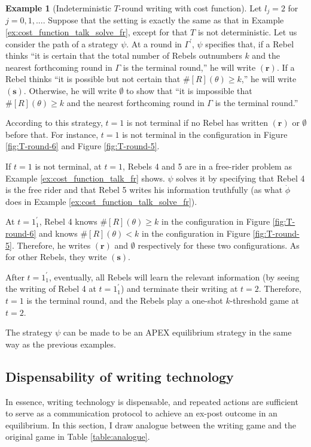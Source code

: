\documentclass[12pt,letter]{article}
\theoremstyle{definition}
\newtheorem{example}{Example}
\theoremstyle{remark}
\theoremstyle{claim}
\begin{document}
\begin{example}[Indeterministic $T$-round writing with cost function]
\label{ex:cost_function_talk_solve_fr_Indm}
Let $l_j=2$ for $j=0,1,...$. Suppose that the setting is exactly the same as that in Example \ref{ex:cost_function_talk_solve_fr}, except for that $T$ is not deterministic. Let us consider the path of a strategy $\psi$. At a round in $\Gamma^{'}$, $\psi$ specifies that, if a Rebel thinks ``it is certain that the total number of Rebels outnumbers $k$ and the nearest forthcoming round in $\Gamma$ is the terminal round,'' he will write $(\textbf{r})$. If a Rebel thinks ``it is possible but not certain that $\# [R](\theta)\geq k$,'' he will write $(\textbf{s})$. Otherwise, he will write $\emptyset$ to show that ``it is impossible that $\#[R](\theta)\geq k$ and the nearest forthcoming round in $\Gamma$ is the terminal round.'' 

According to this strategy, $t=1$ is not terminal if no Rebel has written $(\textbf{r})$ or $\emptyset$ before that. For instance, $t=1$ is not terminal in the configuration in Figure \ref{fig:T-round-6} and Figure \ref{fig:T-round-5}. 

If $t=1$ is not terminal, at $t=1$, Rebels 4 and 5 are in a free-rider problem as Example \ref{ex:cost_function_talk_fr} shows. $\psi$ solves it by specifying that Rebel 4 is the free rider and that Rebel 5 writes his information truthfully (as what $\dot{\phi}$ does in Example \ref{ex:cost_function_talk_solve_fr}). 

At $t=1^{'}_1$, Rebel 4 knows $\#[R](\theta)\geq k$ in the configuration in Figure \ref{fig:T-round-6} and knows $\#[R](\theta)< k$ in the configuration in Figure \ref{fig:T-round-5}. Therefore, he writes $(\textbf{r})$ and $\emptyset$ respectively for these two configurations. As for other Rebels, they write $(\textbf{s})$. 

After $t=1^{'}_1$, eventually, all Rebels will learn the relevant information (by seeing the writing of Rebel 4 at $t=1^{'}_1$) and terminate their writing at $t=2$. Therefore, $t=1$ is the terminal round, and the Rebels play a one-shot $k$-threshold game at $t=2$.

The strategy $\psi$ can be made to be an APEX equilibrium strategy in the same way as the previous examples. 


\end{example}


\subsection{Dispensability of writing technology}
\label{sec:dis_writing}
In essence, writing technology is dispensable, and repeated actions are sufficient to serve as a communication protocol to achieve an ex-post outcome in an equilibrium. In this section, I draw analogue between the writing game and the original game in Table \ref{table:analogue}. 
\end{document}
